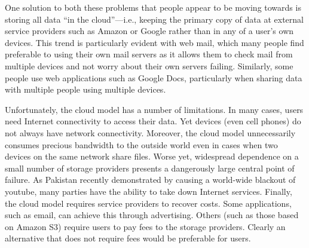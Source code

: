 One solution to both these problems that people appear to be moving
towards is storing all data ``in the cloud''---i.e., keeping the
primary copy of data at external service providers such as Amazon or
Google rather than in any of a user's own devices.  This trend is
particularly evident with web mail, which many people find preferable
to using their own mail servers as it allows them to check mail from
multiple devices and not worry about their own servers failing.
Similarly, some people use web applications such as Google Docs,
particularly when sharing data with multiple people using multiple
devices.

Unfortunately, the cloud model has a number of limitations.  In many
cases, users need Internet connectivity to access their data.  Yet
devices (even cell phones) do not always have network connectivity.
Moreover, the cloud model unnecessarily consumes precious bandwidth to
the outside world even in cases when two devices on the same network
share files.  Worse yet, widespread dependence on a small number of
storage providers presents a dangerously large central point of
failure.  As Pakistan recently demonstrated by causing a world-wide
blackout of youtube, many parties have the ability to take down
Internet services.  Finally, the cloud model requires service
providers to recover costs.  Some applications, such as email, can
achieve this through advertising.  Others (such as those based on
Amazon S3) require users to pay fees to the storage providers.
Clearly an alternative that does not require fees would be preferable
for users.



\endinput


on which they need to
access their data ranging from desktop computer to laptop computers
and mobile smartphones, they face the data management problems of
maintaining multiple versions of a file on different devices. They
achieve synchronization by sending email or eventually relying on a
central remote file server. But manual synchronization is very
error-prone, and a central server cannot be accessed when disconnected
from the network. Moreover, not all users are ready to trust any
organization to store their personnal data.

Collaboration is even more error prone. Users are often force to rely
on one person to cenralize all updates in order to keep track of the
most recent version of a ressource. CVS has answered this problem for
developpers, but requires manual intervention from the user, and
setting up a central repository for files.

